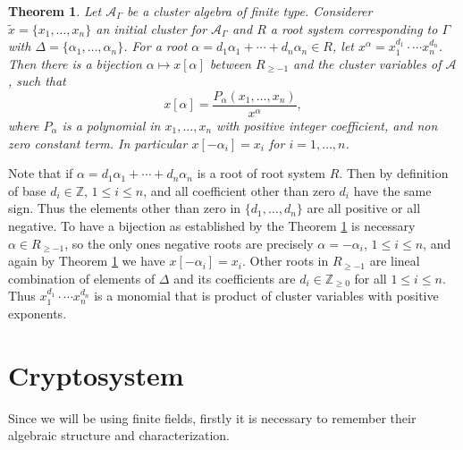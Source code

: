 \documentclass[12pt,a4paper]{article}
\newtheorem{Theorem}{Theorem}[section]
\begin{document}
\begin{Theorem}\label{T16}
Let $\mathcal{A}_{\Gamma}$ be a cluster algebra of finite type. Considerer $\tilde{x}= \{ x_1, \ldots, x_n \}$ an initial cluster for $\mathcal{A}_{\Gamma}$ and $R$ a root system corresponding to $\Gamma$ with $\Delta = \{ \alpha_1, \ldots , \alpha_n \}$. For a root $\alpha = d_1\alpha_1 + \cdots + d_n \alpha_n \in R$, let $x^{\alpha}=x_1^{d_1}\cdot \cdots x_n^{d_n}$. Then there is a bijection $\alpha\mapsto x[\alpha]$ between $R_{\geq -1}$ and the cluster variables of $\mathcal{A}$, such that $$x[\alpha]= \frac{P_{\alpha}(x_1, \ldots, x_n)}{x^{\alpha}},$$ where $P_{\alpha}$ is a polynomial in $x_1,\ldots,x_n$ with positive integer coefficient, and non zero constant term. In particular $x[-\alpha_i]=x_i$ for $i=1,\ldots,n$.
\end{Theorem}

Note that if $\alpha=d_1\alpha_1 + \cdots + d_n \alpha_n$ is a root of root system $R$. Then by definition of base $d_i \in \mathbb{Z}$, $1\leq i\leq n$,  and all coefficient other than zero $d_i$ have the same sign. Thus the elements other than zero in $\lbrace d_1, \ldots, d_n \rbrace$ are all positive or all negative.  To have a bijection as established by the Theorem \ref{T16} is necessary $\alpha \in R_{\geq -1}$, so the only ones negative roots are  precisely $\alpha = -\alpha_i$, $1\leq i \leq n$,  and again by Theorem \ref{T16} we have  $x[-\alpha_i]=x_i$. Other roots in $R_{\geq -1}$ are lineal combination of elements of $\Delta$ and its coefficients are $d_i \in \mathbb{Z}_{\geq0}$ for all $1\leq i \leq n$. Thus $x_1^{d_1}\cdot \cdots x_n^{d_n}$ is a monomial that is product of cluster variables with positive exponents.


\section{Cryptosystem}

Since we will be using finite fields, firstly it is necessary to remember their algebraic structure and characterization.
\end{document}
